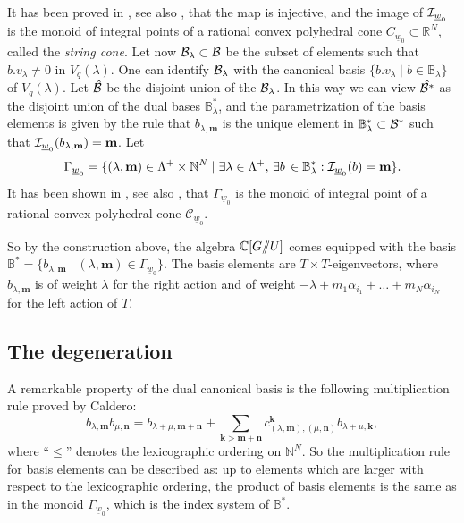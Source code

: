\documentclass{emsprocart}
\theoremstyle{definition}
\begin{document}
It has been proved in \cite{L3}, see also \cite{BZ}, that the map is injective, and the image of ${\cal I}_{\underline{w}_0}$ is the monoid of integral
points of a rational convex polyhedral cone $C_{\underline{w}_0} \subset\mathbb R^N$,  called the {\it string cone}.
Let now ${\cal B}_\lambda\subset\cal B$  be the subset of elements such that $b.v_\lambda\not=0$ in $V_q(\lambda)$.
One can identify ${\cal B}_\lambda$ with the canonical basis $\{b.v_\lambda\mid b\in {\mathbb B}_\lambda\}$
of $V_q(\lambda)$. Let $\hat{\cal B}$ be the disjoint union
of the ${\cal B}_\lambda$. In this way we can view $\hat{\cal B^*}$ as the disjoint union of the dual bases
$\mathbb B^*_\lambda$, and the parametrization of the basis elements is given by the rule that $b_{\lambda,\mathbf m}$ is the unique
element in $\mathbb B^*_\lambda\subset {\cal B^*}$ such that ${\cal I}_{\underline{w}_0}(b_{\lambda,\mathbf m})=\mathbf m$.
Let
\begin{equation}\label{semigroupfirst}
{\Gamma}_{{\underline{w}_0}}=\{(\lambda,\mathbf m)\in\Lambda^+\times \mathbb N^N\mid \exists \lambda\in\Lambda^+,\,\exists
b\,\in \mathbb B^*_\lambda: {\cal I}_{\underline{w}_0}(b)=\mathbf m\}.
\end{equation}
 It has been shown in \cite{L3}, see also \cite{BZ}, that ${\Gamma}_{{\underline{w}_0}}$ is the monoid of integral point
of a rational convex polyhedral cone ${\mathcal C}_{{\underline{w}_0}}$.

So by the construction above, the algebra $\mathbb C[G/\hskip -3.5pt/U]$ comes equipped with the basis
$\mathbb B^*=\{b_{\lambda,\mathbf m}\mid (\lambda,\mathbf m)\in {\Gamma}_{{\underline{w}_0}}\}$. The basis
elements are $T\times T$-eigenvectors, where $b_{\lambda,\mathbf m}$ is of weight $\lambda$ for
the right action and of weight $-\lambda + m_1\alpha_{i_1}+\ldots + m_N\alpha_{i_N}$ for the left action of $T$.

\subsection{The degeneration}\label{thedegeneration}
A remarkable property of the dual canonical basis is the following multiplication rule
proved by Caldero:
$$
b_{\lambda,\mathbf m} b_{\mu,\mathbf n}= b_{\lambda+\mu,\mathbf{m+n}} +
\sum_{\mathbf{k}>\mathbf{m+n}}  c^\mathbf{k}_{(\lambda,\mathbf{m}),(\mu,\mathbf{n})} b_{\lambda+\mu,\mathbf{k}},
$$
where ``$\le$'' denotes the lexicographic ordering on $\mathbb N^N$. So the multiplication rule for basis elements
can be described as: up to elements which are larger with respect to the lexicographic ordering,
the product of basis elements is the same as in the monoid ${\Gamma}_{{\underline{w}_0}}$, which is the index system
of $\mathbb B^*$.
\end{document}
